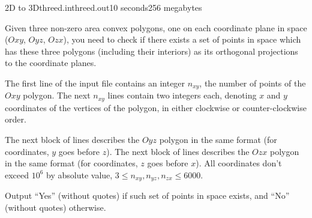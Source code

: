 \begin{problem}{2D to 3D}{threed.in}{threed.out}{10 seconds}{256 megabytes}

Given three non-zero area convex polygons, one on each coordinate plane in space ($Oxy$, $Oyz$, $Ozx$), you need to check if there exists a set of points in space
which has these three polygons (including their interiors) as its orthogonal projections to the
coordinate planes.

\InputFile
The first line of the input file contains an integer $n_{xy}$, the number of points of
the $Oxy$ polygon.
The next $n_{xy}$ lines contain two integers each, denoting $x$ and $y$ coordinates of the vertices of the polygon, in either clockwise or counter-clockwise order.

The next block of lines describes the $Oyz$ polygon in the same format (for coordinates, $y$ goes before $z$).
The next block of lines describes the $Ozx$ polygon in the same format (for coordinates, $z$ goes before $x$).
All coordinates don't exceed $10^6$ by absolute value, $3 \leq n_{xy}, n_{yz}, n_{zx} \leq 6000$.

\OutputFile
Output ``Yes'' (without quotes) if such set of points in space exists, and ``No'' (without quotes) otherwise.

\Examples

\begin{example}
%
%
\end{example}


\end{problem}
